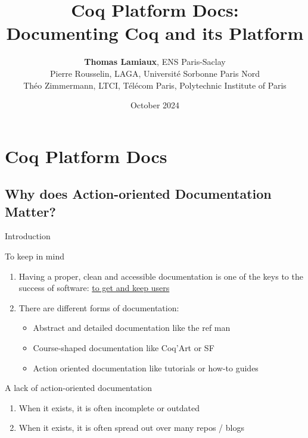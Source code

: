 \documentclass[10pt]{beamer}
\title{Coq Platform Docs: \\ Documenting Coq and its Platform}
\author{\textbf{Thomas Lamiaux}, ENS Paris-Saclay \\
Pierre Rousselin, LAGA, Université Sorbonne Paris Nord \\
Théo Zimmermann, LTCI, Télécom Paris, Polytechnic Institute of Paris }
\date{October 2024}
\begin{document}
\begin{frame}
    \maketitle
\end{frame}


\section*{Coq Platform Docs}

\subsection{Why does Action-oriented Documentation Matter?}

\begin{frame}{Introduction}
  \begin{tcbProp}{To keep in mind}
    \begin{enumerate}
      \item Having a proper, clean and accessible documentation is one of the
            keys to the success of software: \ul{to get and keep users}
      \item<2-> There are different forms of documentation:
      \begin{itemize}[label=$-$]
        \item Abstract and detailed documentation like the ref man
        \item Course-shaped documentation like Coq'Art or SF
        \item Action oriented documentation like tutorials or how-to guides
      \end{itemize}
    \end{enumerate}
  \end{tcbProp}
  \begin{tcbPbl}{A lack of action-oriented documentation }
    \begin{enumerate}
      \item When it exists, it is often incomplete or outdated
      \item When it exists, it is often spread out over many repos / blogs
    \end{enumerate}
  \end{tcbPbl}
\end{frame}
\end{document}
